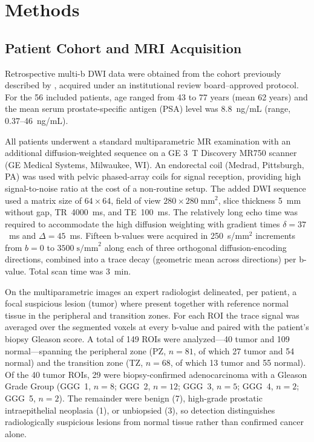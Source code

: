 \section{Methods}

\subsection{Patient Cohort and MRI Acquisition}

Retrospective multi-b DWI data were obtained from the cohort previously described by \citet{langkilde2018evaluation}, acquired under an institutional review board--approved protocol.
For the 56 included patients, age ranged from 43 to 77 years (mean 62 years) and the mean serum prostate-specific antigen (PSA) level was 8.8~ng/mL (range, 0.37--46~ng/mL).

All patients underwent a standard multiparametric MR examination with an additional diffusion-weighted sequence on a GE 3~T Discovery MR750 scanner (GE Medical Systems, Milwaukee, WI).
An endorectal coil (Medrad, Pittsburgh, PA) was used with pelvic phased-array coils for signal reception, providing high signal-to-noise ratio at the cost of a non-routine setup.
The added DWI sequence used a matrix size of $64 \times 64$, field of view $280 \times 280\;\text{mm}^2$, slice thickness 5~mm without gap, TR~4000~ms, and TE~100~ms. The relatively long echo time was required to accommodate the high diffusion weighting with gradient times $\delta = 37$~ms and $\Delta = 45$~ms.
Fifteen b-values were acquired in 250~s/mm$^2$ increments from $b = 0$ to $3500\;\text{s/mm}^2$ along each of three orthogonal diffusion-encoding directions, combined into a trace decay (geometric mean across directions) per b-value. Total scan time was 3~min.

On the multiparametric images an expert radiologist delineated, per patient, a focal suspicious lesion (tumor) where present together with reference normal tissue in the peripheral and transition zones. For each ROI the trace signal was averaged over the segmented voxels at every b-value and paired with the patient's biopsy Gleason score.
A total of 149 ROIs were analyzed---40 tumor and 109 normal---spanning the peripheral zone (PZ, $n = 81$, of which 27 tumor and 54 normal) and the transition zone (TZ, $n = 68$, of which 13 tumor and 55 normal).
Of the 40 tumor ROIs, 29 were biopsy-confirmed adenocarcinoma with a Gleason Grade Group (GGG~1, $n = 8$; GGG~2, $n = 12$; GGG~3, $n = 5$; GGG~4, $n = 2$; GGG~5, $n = 2$). The remainder were benign (7), high-grade prostatic intraepithelial neoplasia (1), or unbiopsied (3), so detection distinguishes radiologically suspicious lesions from normal tissue rather than confirmed cancer alone.

